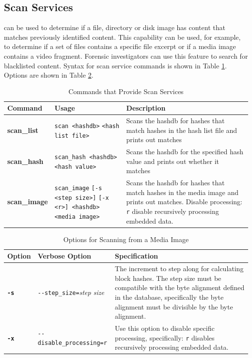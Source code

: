 \documentclass[11pt,fleqn]{article} %
\begin{document}
\subsection{Scan Services}
\label{ScanServices}
\hdb can be used to determine if a file, directory or disk image has content that matches previously identified content. This capability can be used, for example, to determine if a set of files contains a specific file excerpt or if a media image contains a video fragment. Forensic investigators can use this feature to search for blacklisted content.
Syntax for scan service commands is shown in Table \ref{tab:scanServices}. Options are shown in Table \ref{tab:ScanOptions}.\\

\begin{table}[!ht]
\centering
\caption{Commands that Provide Scan Services}
\label{tab:scanServices}
\begin{tabular}{|p{3.5 cm}|p{6 cm}|p{4 cm}|}
\hline \hline
\textbf{Command} & \textbf{Usage} & \textbf{Description} \\
\hline
\textbf{scan\_list} & \verb+scan <hashdb>+ \verb+<hash list file>+ & Scans the hashdb for hashes that match hashes in the hash list file and prints out matches\\
\hline
\textbf{scan\_hash} & \verb+scan_hash <hashdb>+ \verb+<hash value>+ & Scans the hashdb for the specified hash value and prints out whether it matches\\
\hline
\textbf{scan\_image} & \verb+scan_image+ \verb+[-s <step size>]+ \verb+[-x <r>] <hashdb>+ \verb+<media image>+ & Scans the hashdb for hashes that match hashes in the media image and prints out matches. Disable processing: \verb+r+ disable recursively processing embedded data.\\
\hline
\end{tabular}
\end{table}

\begin{table}[!ht]
\centering
\caption{Options for Scanning from a Media Image}
\label{tab:ScanOptions}
\begin{tabular}{|p{1.5 cm}|p{8 cm}|p{4 cm}|}
\hline \hline
\textbf{Option} & \textbf{Verbose Option} & \textbf{Specification} \\
\hline
\textbf{\texttt{-s}} & \verb+--step_size=+\textit{step size} & The increment to step along for calculating block hashes. The step size must be compatible with the byte alignment defined in the database, specifically the byte alignment must be divisible by the byte alignment.\\
\hline
\textbf{\texttt{-x}} & \verb+--disable_processing=r+ & Use this option to disable specific processing, specifically: \verb+r+ disables recursively processing embedded data.\\
\hline
\end{tabular}
\end{table}
\end{document}
